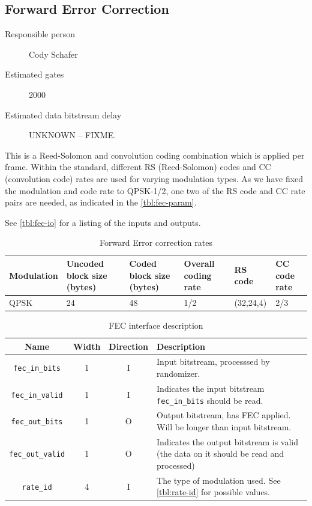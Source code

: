 \documentclass[dvips,10pt,twocolumn]{article}
\begin{document}

\subsection{Forward Error Correction}
\label{sec:fec}
\begin{description}
	\item[Responsible person] Cody Schafer 
	\item[Estimated gates] 2000
	\item[Estimated data bitstream delay] UNKNOWN -- FIXME.
\end{description}

This is a Reed-Solomon and convolution coding combination
which is applied per frame. Within the standard, different
RS (Reed-Solomon) codes and CC (convolution code) rates are
used for varying modulation types. As we have fixed the
modulation and code rate to QPSK-1/2, one two of the RS
code and CC rate pairs are needed, as indicated in the
\autoref{tbl:fec-param}.

See \autoref{tbl:fec-io} for a listing of the inputs and outputs.

\begin{table}
	\begin{tabularx}{\textwidth}{X|X|X|X|X|X}
	\label{tbl:fec-param}
		Modulation & Uncoded block size (bytes) &
		Coded block size (bytes) & Overall coding
		rate & RS code & CC code rate \\ \hline
		QPSK & 24 & 48 & 1/2 & (32,24,4) & 2/3 \\
	\end{tabularx}
	\caption{Forward Error correction rates}
\end{table}

\begin{table} \begin{tabularx}{\textwidth}{c|c|c|X}
	\label{tbl:fec-io}
	Name & Width & Direction & Description \\ \hline

	\texttt{fec\_in\_bits} & 1 & I & Input bitstream, processsed by randomizer.
	\\

	\texttt{fec\_in\_valid} & 1 & I & Indicates the input bitstream
	\texttt{fec\_in\_bits} should be read.\\

	\texttt{fec\_out\_bits} & 1 & O & Output bitstream, has FEC
	applied. Will be longer than input bitstream. \\

	\texttt{fec\_out\_valid} & 1 & O & Indicates the output bitstream
	is valid (the data on it should be read and processed) \\

	\texttt{rate\_id} & 4 & I & The type of modulation used. See
	\autoref{tbl:rate-id} for possible values.

\end{tabularx} \caption{FEC interface description} \end{table}
\end{document}
